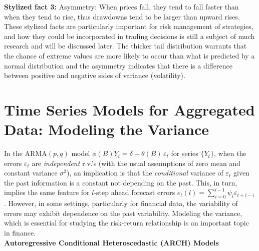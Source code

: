 \noindent\textbf{Stylized fact 3:} Asymmetry: When prices fall, they tend to fall faster
than when they tend to rise, thus drawdowns tend to be larger than upward rises. \\


These stylized facts are particularly important for risk management of strategies, and how they could be incorporated in trading decisions is still a subject of much research and will be discussed later. The thicker tail distribution warrants that the chance of extreme values are more likely to occur than what is predicted by a normal distribution and the asymmetry indicates that there is a difference between positive and negative sides of variance (volatility). 



\section{Time Series Models for Aggregated Data: Modeling the Variance}


In the ARMA$(p,q)$ model $\phi(B)Y_t= \delta + \theta(B) \,\varepsilon_t$ for series $\{ Y_t \}$, when the errors $\varepsilon_t$ are \emph{independent} r.v.'s (with the usual assumptions of zero mean and constant variance $\sigma^2$), an implication is that the \textit{conditional} variance of $\varepsilon_t$ given the past information is a constant not depending on the past. This, in turn, implies the same feature for $l$-step ahead forecast errors $e_t(l) = \sum_{i=0}^{l-1} \psi_i \varepsilon_{t+l-i}$. However, in some settings, particularly for financial data, the variability of errors may exhibit dependence on the past variability. Modeling the variance, which is essential for studying the risk-return relationship is an important topic in finance. \\


\noindent \textbf{Autoregressive Conditional Heteroscedastic (ARCH) Models} \\


